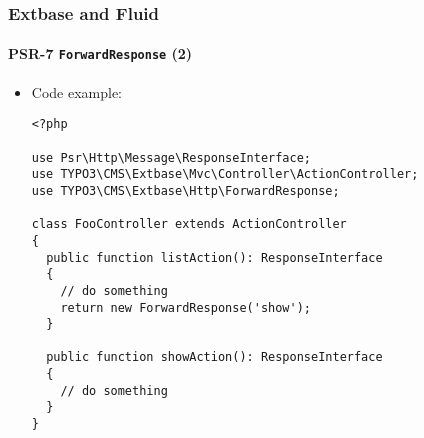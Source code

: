 %

\begin{frame}[fragile]
	\frametitle{Extbase and Fluid}
	\framesubtitle{PSR-7 \texttt{ForwardResponse} (2)}


	\begin{itemize}
		\item Code example:
\begin{lstlisting}
<?php

use Psr\Http\Message\ResponseInterface;
use TYPO3\CMS\Extbase\Mvc\Controller\ActionController;
use TYPO3\CMS\Extbase\Http\ForwardResponse;

class FooController extends ActionController
{
  public function listAction(): ResponseInterface
  {
    // do something
    return new ForwardResponse('show');
  }

  public function showAction(): ResponseInterface
  {
    // do something
  }
}
\end{lstlisting}

	\end{itemize}

\end{frame}


